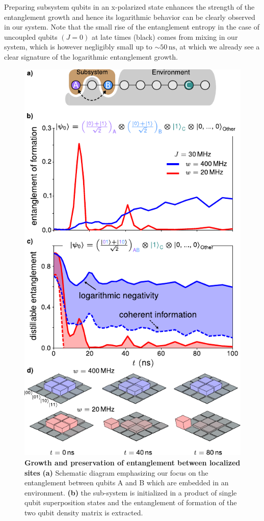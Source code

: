 Preparing subsystem qubits in an x-polarized state enhances the strength of the entanglement growth and hence its logarithmic behavior can be clearly observed in our system.
Note that the small rise of the entanglement entropy in the case of uncoupled qubits $\left( J=0 \right)$ at late times (black) comes from mixing in our system, which is however negligibly small up to $\sim50\,\text{ns}$, at which we already see a clear signature of the logarithmic entanglement growth.




\begin{figure}[tb!]
    \centering
        \includegraphics[width=89 mm, keepaspectratio]{./PDF/f6_190716_1129a.pdf}
        \caption{\small
        \textbf{Growth and preservation of entanglement between localized sites}
        \textbf{(a)} Schematic diagram emphasizing our focus on the entanglement between qubits A and B which are embedded in an environment.
        \textbf{(b)}  the sub-system is initialized in a product of single qubit superposition states and the entanglement of formation of the two qubit density matrix is extracted.
}
\end{figure}
